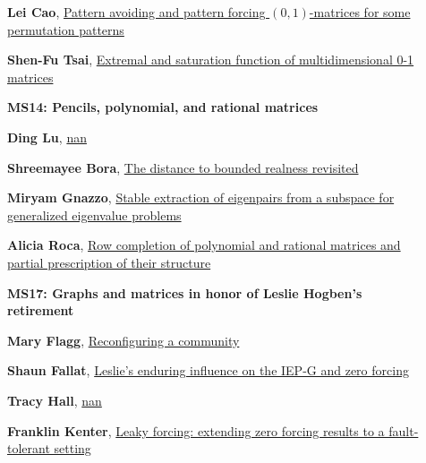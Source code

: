 \documentclass[ILAS2025-program.tex]{subfiles}
\begin{document}
\begin{description}
\begin{description}
        \item[] \hypertarget{up0369}{}\textbf{Lei Cao}, \hyperlink{down0369}{Pattern avoiding and pattern forcing $(0,1)$-matrices for some permutation patterns
}
        \item[] \hypertarget{up0370}{}\textbf{Shen-Fu Tsai}, \hyperlink{down0370}{Extremal and saturation function of multidimensional 0-1 matrices
}
        \end{description}
    \begin{description}
    \item[] {\color{mstitle}\textbf{MS14: Pencils, polynomial, and rational matrices}} 
    \item[] \hypertarget{up0371}{}\textbf{Ding Lu}, \hyperlink{down0371}{nan}
        \item[] \hypertarget{up0372}{}\textbf{Shreemayee Bora}, \hyperlink{down0372}{The distance to bounded realness revisited}
        \item[] \hypertarget{up0373}{}\textbf{Miryam Gnazzo}, \hyperlink{down0373}{Stable extraction of eigenpairs from a subspace for generalized eigenvalue problems}
        \item[] \hypertarget{up0374}{}\textbf{Alicia Roca}, \hyperlink{down0374}{Row completion of polynomial and rational matrices and partial prescription of their  structure}
        \end{description}
    \begin{description}
    \item[] {\color{mstitle}\textbf{MS17: Graphs and matrices in honor of Leslie Hogben's retirement}} 
    \item[] \hypertarget{up0375}{}\textbf{Mary Flagg}, \hyperlink{down0375}{Reconfiguring a community}
        \item[] \hypertarget{up0376}{}\textbf{Shaun Fallat}, \hyperlink{down0376}{Leslie's enduring influence on the IEP-G and zero forcing}
        \item[] \hypertarget{up0377}{}\textbf{Tracy Hall}, \hyperlink{down0377}{nan}
        \item[] \hypertarget{up0378}{}\textbf{Franklin Kenter}, \hyperlink{down0378}{Leaky forcing: extending zero forcing results to a fault-tolerant setting}
        \end{description}

\end{description}
\end{document}
